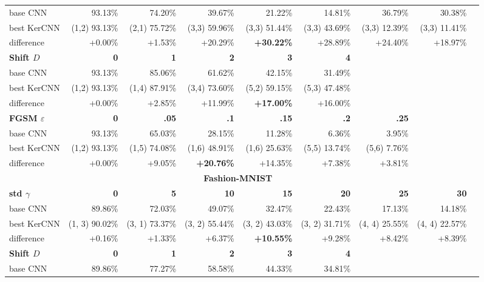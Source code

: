 \documentclass[11pt,oneside,reqno]{amsart}
\begin{document}
{\begin{table}[htbp!]
\begin{tabular}{@{}lrrrrrrrr@{}}
      base CNN & 93.13\% & 74.20\% & 39.67\% & 21.22\% & 14.81\% & 36.79\% & 30.38\% \\ 
      best KerCNN & (1,2) 93.13\% & (2,1) 75.72\% & (3,3) 59.96\% & (3,3) 51.44\% & (3,3) 43.69\% & (3,3) 12.39\% & (3,3) 11.41\% \\
      difference & +0.00\% & +1.53\% & +20.29\% & \textbf{+30.22\%} & +28.89\% & +24.40\% & +18.97\% \vspace{5pt}\\ 
     \textbf{Shift $D$} & \textbf{0} & \textbf{1} & \textbf{2} & \textbf{3} & \textbf{4} & & \\
   base CNN    & 93.13\% & 85.06\% & 61.62\% & 42.15\% & 31.49\% & & \\ 
    best KerCNN & (1,2) 93.13\% & (1,4) 87.91\% & (3,4) 73.60\% & (5,2) 59.15\% & (5,3) 47.48\% & & \\
    difference & +0.00\% & +2.85\% & +11.99\% & \textbf{+17.00\%} & +16.00\% & & \vspace{5pt}\\
    \textbf{FGSM $\varepsilon$} & \textbf{0} & \textbf{.05} & \textbf{.1} & \textbf{.15} & \textbf{.2} & \textbf{.25} & \\
   base CNN    & 93.13\% & 65.03\% & 28.15\% & 11.28\% & 6.36\% & 3.95\% & \\ 
    best KerCNN & (1,2) 93.13\% & (1,5) 74.08\% & (1,6) 48.91\% & (1,6) 25.63\% & (5,5) 13.74\% & (5,6) 7.76\% & \\
    difference & +0.00\% & +9.05\% & \textbf{+20.76\%} & +14.35\% & +7.38\% & +3.81\% & \\
    \midrule
      \multicolumn{8}{c}{\textbf{Fashion-MNIST}}\vspace{5pt}\\
    \textbf{std $\gamma$} & \textbf{0} & \textbf{5} & \textbf{10} & \textbf{15} & \textbf{20} & \textbf{25} & \textbf{30} \\
     base CNN    & 89.86\% & 72.03\% & 49.07\% & 32.47\% & 22.43\% & 17.13\% & 14.18\% \\ 
      best KerCNN & (1, 3) 90.02\% & (3, 1) 73.37\% & (3, 2) 55.44\% & (3, 2) 43.03\% & (3, 2) 31.71\% & (4, 4) 25.55\% & (4, 4) 22.57\% \\
      difference & +0.16\% & +1.33\% & +6.37\% & \textbf{+10.55\%} & +9.28\% & +8.42\% & +8.39\% \vspace{5pt}\\  
    \textbf{Shift $D$} & \textbf{0} & \textbf{1} & \textbf{2} & \textbf{3} & \textbf{4} & & \\
   base CNN    & 89.86\% & 77.27\% & 58.58\% & 44.33\% & 34.81\% &  & \\ 

\end{tabular}
\end{table}}
\end{document}
